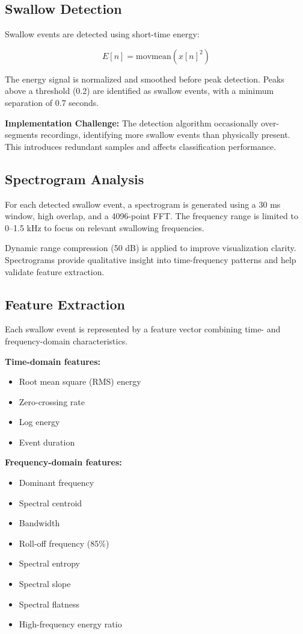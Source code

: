 \documentclass[conference]{IEEEtran}
\begin{document}
\subsection{Swallow Detection}

Swallow events are detected using short-time energy:

\[
E[n] = \text{movmean}(x[n]^2)
\]

The energy signal is normalized and smoothed before peak detection. Peaks above a threshold (0.2) are identified as swallow events, with a minimum separation of 0.7 seconds.

\textbf{Implementation Challenge:}  
The detection algorithm occasionally over-segments recordings, identifying more swallow events than physically present. This introduces redundant samples and affects classification performance.

\subsection{Spectrogram Analysis}

For each detected swallow event, a spectrogram is generated using a 30 ms window, high overlap, and a 4096-point FFT. The frequency range is limited to 0–1.5 kHz to focus on relevant swallowing frequencies.

Dynamic range compression (50 dB) is applied to improve visualization clarity. Spectrograms provide qualitative insight into time-frequency patterns and help validate feature extraction.

\subsection{Feature Extraction}

Each swallow event is represented by a feature vector combining time- and frequency-domain characteristics.

\textbf{Time-domain features:}
\begin{itemize}
    \item Root mean square (RMS) energy
    \item Zero-crossing rate
    \item Log energy
    \item Event duration
\end{itemize}

\textbf{Frequency-domain features:}
\begin{itemize}
    \item Dominant frequency
    \item Spectral centroid
    \item Bandwidth
    \item Roll-off frequency (85\%)
    \item Spectral entropy
    \item Spectral slope
    \item Spectral flatness
    \item High-frequency energy ratio
\end{itemize}
\end{document}
